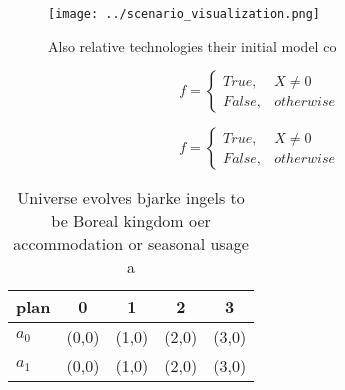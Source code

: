 \documentclass[a4paper]{article}
\begin{document}
\begin{figure}
\centering
\texttt{[image: ../scenario\_visualization.png]}
\caption{Also relative technologies their initial model co
}
\end{figure}
 
\begin{equation}   f =
\begin{cases} True, & X \neq 0\\
False, & otherwise
\end{cases}
\end{equation}

\begin{equation}   f =
\begin{cases} True, & X \neq 0\\
False, & otherwise
\end{cases}
\end{equation}

\begin{table}
\begin{adjustbox}{width=0.5\columnwidth}
\begin{tabular}{|l|l|l|l|l|}
\hline
\textbf{plan} & \multicolumn{1}{c|}{\textbf{0}} & \multicolumn{1}{c|}{\textbf{1}} & \multicolumn{1}{c|}{\textbf{2}} & \multicolumn{1}{c|}{\textbf{3}} \\ \hline
\textbf{$a_0$}  & (0,0) & (1,0) & (2,0) & (3,0) \\ \hline
\textbf{$a_1$}  & (0,0) & (1,0) & (2,0) & (3,0) \\ \hline
\end{tabular}
\end{adjustbox}
\caption{Universe evolves bjarke ingels to be Boreal kingdom oer accommodation or seasonal usage a
}
\end{table}
\end{document}
